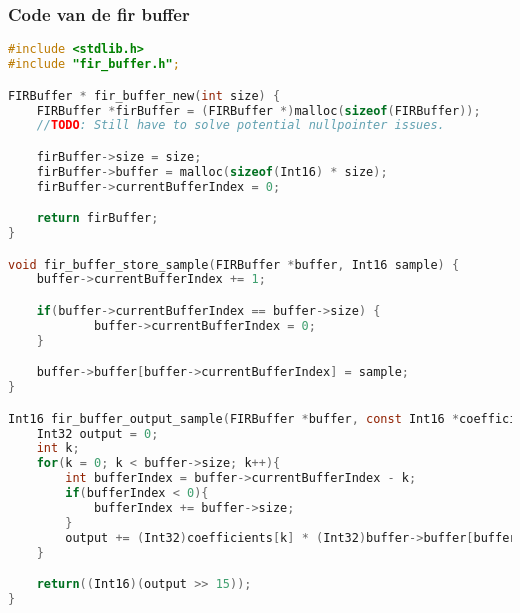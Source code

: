            \subsubsection{Code van de fir buffer}
            \begin{lstlisting}[language=c]
#include <stdlib.h>
#include "fir_buffer.h";

FIRBuffer * fir_buffer_new(int size) {
    FIRBuffer *firBuffer = (FIRBuffer *)malloc(sizeof(FIRBuffer));
    //TODO: Still have to solve potential nullpointer issues.

    firBuffer->size = size;
    firBuffer->buffer = malloc(sizeof(Int16) * size);
    firBuffer->currentBufferIndex = 0;

    return firBuffer;
}

void fir_buffer_store_sample(FIRBuffer *buffer, Int16 sample) {
    buffer->currentBufferIndex += 1;

    if(buffer->currentBufferIndex == buffer->size) {
            buffer->currentBufferIndex = 0;
    }

    buffer->buffer[buffer->currentBufferIndex] = sample;
}

Int16 fir_buffer_output_sample(FIRBuffer *buffer, const Int16 *coefficients) {
    Int32 output = 0;
    int k;
    for(k = 0; k < buffer->size; k++){
        int bufferIndex = buffer->currentBufferIndex - k;
        if(bufferIndex < 0){
            bufferIndex += buffer->size;
        }
        output += (Int32)coefficients[k] * (Int32)buffer->buffer[bufferIndex];
    }

    return((Int16)(output >> 15));
}
            \end{lstlisting}
            \clearpage	
        
